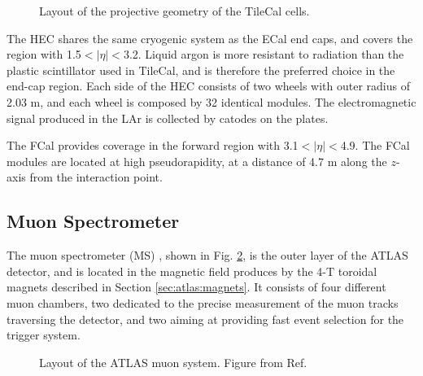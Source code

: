 \begin{figure}[ht]
\centering
{}
\caption{Layout of the projective geometry of the TileCal cells.}
\label{fig:atlas:tile_cells}
\end{figure}

The HEC shares the same cryogenic system as the ECal end caps, and covers the region with 1.5$<|\eta|<$3.2. Liquid argon is more resistant to radiation than the plastic scintillator used in TileCal, and is therefore the preferred choice in the end-cap region. Each side of the HEC consists of two wheels with outer radius of 2.03 m, and each wheel is composed by 32 identical modules. The electromagnetic signal produced in the LAr is collected by catodes on the plates. 

The FCal provides coverage in the forward region with 3.1$<|\eta|<$4.9. The FCal modules are located at high pseudorapidity, at a distance of 4.7 m along the $z$-axis from the interaction point.


\subsection{Muon Spectrometer}

The muon spectrometer (MS) \cite{ATLAS:1997ad}, shown in Fig. \ref{fig:atlas:muon}, is the outer layer of the ATLAS detector, and is located in the magnetic field produces by the 4-T toroidal magnets described in Section \ref{sec:atlas:magnets}. It consists of four different muon chambers, two dedicated to the precise measurement of the muon tracks traversing the detector, and two aiming at providing fast event selection for the trigger system. 

\begin{figure}[ht]
\centering
{}
\caption{Layout of the ATLAS muon system. Figure from Ref. \cite{atlas:atlas}}
\label{fig:atlas:muon}
\end{figure}

